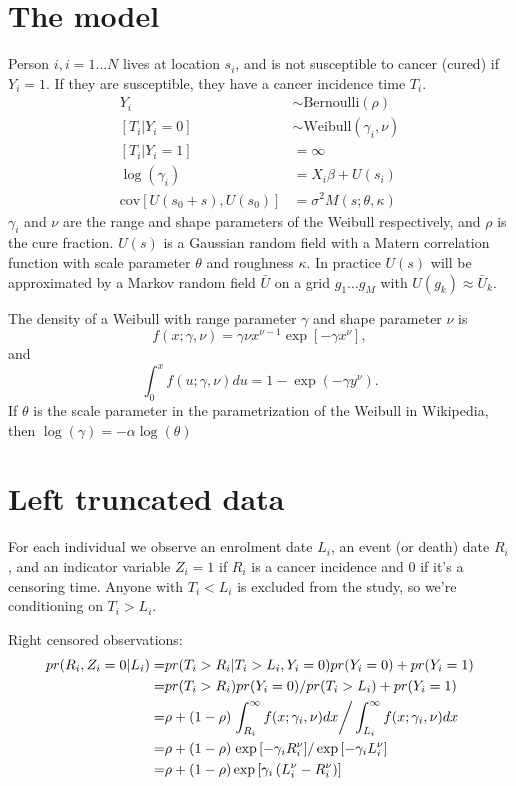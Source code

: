 \documentclass{article}
\begin{document}
\section{The model}
Person $i, i=1\ldots N$ lives at location $s_i$, and is not susceptible to cancer (cured) if $Y_i=1$.  If they are susceptible, they have a cancer incidence time $T_i$.
\begin{align*}
Y_i & \sim \text{Bernoulli}(\rho)\\
[T_i | Y_i = 0] &\sim \text{Weibull}(\gamma_i, \nu)\\
[T_i | Y_i = 1] & = \infty \\
\log(\gamma_i) &= X_i \beta + U(s_i)\\
\text{cov}[U(s_0 + s), U(s_0)] &= \sigma^2 M(s; \theta, \kappa) 
\end{align*}
$\gamma_i$ and $\nu$ are the range and shape parameters of the Weibull respectively, and $\rho$ is the cure fraction.  $U(s)$ is a Gaussian random field with a Matern correlation function with scale parameter $\theta$ and roughness $\kappa$.  In practice $U(s)$ will be approximated by a Markov random field $\bar U$ on a grid $g_1 \ldots g_M$ with $U(g_k) \approx \bar U_k$.



The density of a Weibull with range parameter $\gamma$ and shape parameter $\nu$ is 
\[
f(x;\gamma,\nu) =  \gamma \nu x^{\nu-1} \exp\left[-	\gamma x^\nu\right],
\]
and
\[
\int_0^x f(u;\gamma,\nu)du = 1-\exp(-\gamma y^\nu).
\]
If $\theta$ is the scale parameter in the parametrization of the Weibull in Wikipedia, then 
$\log(\gamma) = -\alpha\log(\theta)$


\section{Left truncated data}
For each individual we observe an enrolment date $L_i$, an event (or death) date $R_i$, and an indicator variable $Z_i = 1$ if $R_i$ is a cancer incidence and 0 if it's a censoring time. Anyone with $T_i < L_i$ is excluded from the study, so we're conditioning on $T_i > L_i$.  

Right censored observations:
\begin{align*}
pr(R_i, Z_i=0 | L_i) =& pr(T_i > R_i | T_i > L_i, Y_i =0) pr(Y_i =0)  + pr(Y_i =1)\\
=&pr(T_i > R_i) pr(Y_i = 0)/pr(T_i > L_i) + pr(Y_i =1)\\
=& \rho + (1-\rho) \left. \int_{R_i}^\infty f(x;\gamma_i, \nu) dx \right/\int_{L_i}^\infty f(x;\gamma_i, \nu) dx  \\
= &  \rho + (1-\rho) \left. \exp\left[-\gamma_i R_i^\nu\right] \right/\exp\left[-\gamma_i L_i^\nu\right]\\
= &  \rho + (1-\rho) \exp\left[\gamma_i\left(L_i^\nu -R_i^\nu\right)\right] \\
\end{align*}
\end{document}
